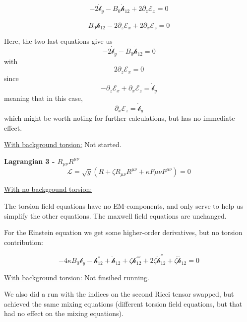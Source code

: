 \documentclass[letterpaper,12pt]{article}
\begin{document}
\begin{equation}
-2 \dot{\mathcal{b}}_y-B_0\dot{\mathcal{h}}_{12}+2\partial_z\mathcal{E}_x=0
\end{equation}

\begin{equation}
B_0\dot{\mathcal{h}}_{12}-2\partial_z\mathcal{E}_x+2\partial_x\mathcal{E}_z=0
\end{equation}

Here, the two last equations give us
\begin{equation}
-2 \dot{\mathcal{b}}_y-B_0\dot{\mathcal{h}}_{12}=0
\end{equation}
with
\begin{equation}
2\partial_z\mathcal{E}_x=0
\end{equation}
since
\begin{equation}
-\partial_z\mathcal{E}_x+\partial_x\mathcal{E}_z=\dot{\mathcal{b}}_y
\end{equation}
meaning that in this case,
\begin{equation}
\partial_x\mathcal{E}_z=\dot{\mathcal{b}}_y
\end{equation}
which might be worth noting for further calculations, but has no immediate effect.


\underline{With background torsion:}
Not started.



\textbf{Lagrangian 3 - $R_{\mu \nu} R^{\mu \nu}$}
\begin{equation}
\mathcal{L}=\sqrt{g}(R+\zeta R_{\mu \nu} R^{\mu \nu}+\kappa F{\mu \nu}F^{\mu \nu})=0
\end{equation}

\underline{With no background torsion:}

The torsion field equations have no EM-components, and only serve to help us simplify the other equations.
The maxwell field equations are unchanged. 

For the Einstein equation we get some higher-order derivatives, but no torsion contribution:

\begin{equation}
-4 \kappa B_0 \mathcal{b}_y-\mathcal{h}_{12}^{''}+\ddot{\mathcal{h}}_{12}+\zeta \mathcal{h}^{''''}_{12}+2  \zeta \ddot{\mathcal{h}}_{12}^{''}+\zeta \ddddot{\mathcal{h}}_{12}=0
\end{equation}


\underline{With background torsion:} Not finsihed running.


We also did a run with the indices on the second Ricci tensor swapped, but achieved the same mixing equations (different torsion field equations, but that had no effect on the mixing equations).
\end{document}
